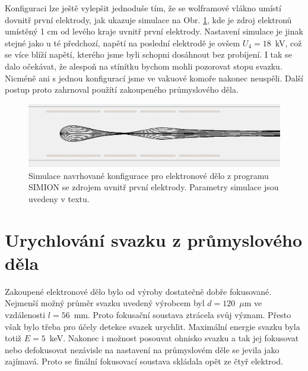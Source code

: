 Konfiguraci lze ještě vylepšit jednoduše tím, že se wolframové vlákno umístí dovnitř první elektrody, jak ukazuje simulace na Obr. \ref{05simulaceVlastniDeloWehnelt}, kde je zdroj elektronů umístěný 1 cm od levého kraje uvnitř první elektrody. Nastavení simulace je jinak stejné jako u té předchozí, napětí na poslední elektrodě je ovšem $U_4 = 18$~kV, což se více blíží napětí, kterého jsme byli schopni dosáhnout bez probíjení. I tak se dalo očekávat, že alespoň na stínítku bychom mohli pozorovat stopu svazku. Nicméně ani s jednou konfigurací jsme ve vakuové komoře nakonec neuspěli. Další postup proto zahrnoval použítí zakoupeného průmyslového děla.\\

\begin{figure}[htbp!]
\centering
\includegraphics[width = 366 pt]{Figure/05/2c.jpg}
\caption[Simulace navrhované konfigurace pro elektronové dělo z programu SIMION se zdrojem uvnitř první elektrody.]{Simulace navrhované konfigurace pro elektronové dělo z programu SIMION se zdrojem uvnitř první elektrody. Parametry simulace jsou uvedeny v textu. }
\label{05simulaceVlastniDeloWehnelt}
\end{figure}

\section{Urychlování svazku z průmyslového děla}
\label{simulaceKuba}

Zakoupené elektronové dělo bylo od výroby dostatečně dobře fokusované. Nejmenší možný průměr svazku uvedený výrobcem byl $d = 120$~$\mu$m ve vzdálenosti $l = 56$~mm. Proto fokusační soustava ztrácela svůj význam. Přesto však bylo třeba pro účely detekce svazek urychlit. Maximální energie svazku byla totiž $E = 5$~keV. Nakonec i možnost posouvat ohnisko svazku a tak jej fokusovat nebo defokusovat nezávisle na nastavení na průmyslovém děle se jevila jako zajímavá. Proto se finální fokusovací soustava skládala opět ze čtyř elektrod.\\

